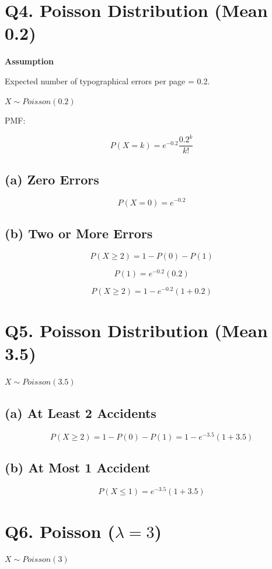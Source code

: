 \documentclass[11pt]{article}
\begin{document}
\section*{\textbf{Q4. Poisson Distribution (Mean 0.2)}}

\textbf{Assumption}

Expected number of typographical errors per page = 0.2.

$X \sim Poisson(0.2)$

PMF:

\[
P(X=k)=e^{-0.2}\frac{0.2^k}{k!}
\]

\subsection*{\textbf{(a) Zero Errors}}

\[
P(X=0)=e^{-0.2}
\]

\subsection*{\textbf{(b) Two or More Errors}}

\[
P(X \ge 2)=1-P(0)-P(1)
\]

\[
P(1)=e^{-0.2}(0.2)
\]

\[
P(X \ge 2)=1-e^{-0.2}(1+0.2)
\]

\section*{\textbf{Q5. Poisson Distribution (Mean 3.5)}}

$X \sim Poisson(3.5)$

\subsection*{\textbf{(a) At Least 2 Accidents}}

\[
P(X \ge 2)=1-P(0)-P(1)=1-e^{-3.5}(1+3.5)
\]

\subsection*{\textbf{(b) At Most 1 Accident}}

\[
P(X \le 1)=e^{-3.5}(1+3.5)
\]

\section*{\textbf{Q6. Poisson ($\lambda = 3$)}}

$X \sim Poisson(3)$
\end{document}
